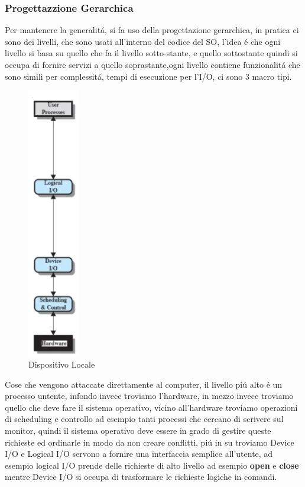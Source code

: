 \subsubsection*{Progettazzione Gerarchica}
Per mantenere la generalitá, si fa uso della progettazione gerarchica, in pratica ci sono dei livelli, che sono usati
all'interno del codice del SO, l'idea é che ogni livello si basa su quello che fa il livello sotto-stante, e quello sottostante
quindi si occupa di fornire servizi a quello soprastante,ogni livello contiene funzionalitá che sono simili per complessitá, tempi di esecuzione
per l'I/O, ci sono 3 macro tipi.
\begin{figure}[H]
    \centering
    \includegraphics[width=0.2\textwidth]{immagini/DispositivoLocaleI_O}
    \caption{Dispositivo Locale}
\end{figure}
Cose che vengono attaccate direttamente al computer, il livello piú alto é un processo untente, infondo
invece troviamo l'hardware, in mezzo invece troviamo quello che deve fare il sistema operativo, vicino all'hardware troviamo operazioni
di scheduling e controllo ad esempio tanti processi che cercano di scrivere sul monitor, quindi il sistema operativo
deve essere in grado di gestire queste richieste ed ordinarle in modo da non creare conflitti, piú in su troviamo
Device I/O e Logical I/O servono a fornire una interfaccia semplice all'utente, ad esempio logical I/O prende delle richieste
di alto livello ad esempio \textbf{open} e \textbf{close} mentre Device I/O si occupa di trasformare le richieste logiche in comandi.
